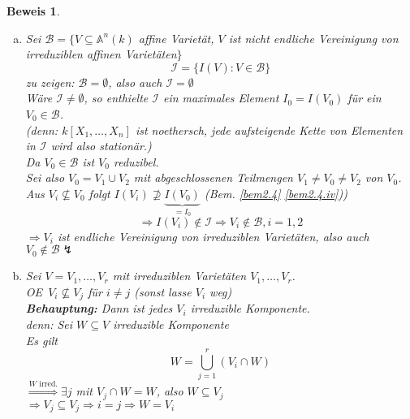 \documentclass[a4paper,12pt]{report}
\theoremstyle{break}
\theoremstyle{nonumberbreak}
\newtheorem{Bew}{Beweis}
\theoremstyle{nonumberplain}
\newcommand{\A}{\mathbb{A}}
\renewcommand{\OE}{O\!\!E~}
\begin{document}
\begin{Bew}\begin{enumerate}[a)]
\item
Sei $\mathcal B=\{V\subseteq \A ^n(k)$ affine Variet\"at, $V$ ist \emph{nicht} endliche Vereinigung von irreduziblen affinen Variet\"aten$\}$
\[\mathcal I =\{I(V) : V\in \mathcal B\}\]
\emph{zu zeigen:} $\mathcal B = \emptyset$, also auch $\mathcal I = \emptyset$\\
W\"are $\mathcal I \neq \emptyset$, so enthielte $\mathcal I$ ein maximales Element $I_0=I(V_0)$ f\"ur ein $V_0\in \mathcal B$.\\
(\emph{denn:} $k[X_1,\dots ,X_n]$ ist noethersch, jede aufsteigende Kette von Elementen in $\mathcal I$ wird also station\"ar.)\\
Da $V_0\in \mathcal B$ ist $V_0$ reduzibel.\\
Sei also $V_0=V_1\cup V_2$ mit abgeschlossenen Teilmengen $V_1\neq V_0 \neq V_2$ von $V_0$.\\
Aus $V_i\nsubseteq V_0$ folgt $I(V_i)\nsupseteq\underbrace{I(V_0)}_{=I_0}$ (Bem. \ref{bem2.4} \ref{bem2.4.iv}))
\[\Rightarrow I(V_i)\notin \mathcal I \Rightarrow V_i\notin \mathcal B, i=1,2\]
$\Rightarrow V_i$ ist endliche Vereinigung von irreduziblen Variet\"aten, also auch $V_0 \notin \mathcal B \lightning$

\item
Sei $V=V_1,\dots ,V_r$ mit irreduziblen Variet\"aten $V_1,\dots ,V_r$.\\
\OE $V_i\nsubseteq V_j$ f\"ur $i\neq j$ (sonst lasse $V_i$ weg)\\
\textbf{Behauptung:} Dann ist jedes $V_i$ irreduzible Komponente.\\
\emph{denn:} Sei $W \subseteq V$ irreduzible Komponente\\
Es gilt \[W = \bigcup_{j=1}^r (V_i \cap W)\]
$\overset{W \textrm{ irred.}}{\Longrightarrow} \exists j$ mit $V_j \cap W=W$, also $W\subseteq V_j$\\
$\Rightarrow V_j\subseteq V_j \Rightarrow i=j\Rightarrow W=V_i$\end{enumerate}\end{Bew}
\end{document}
